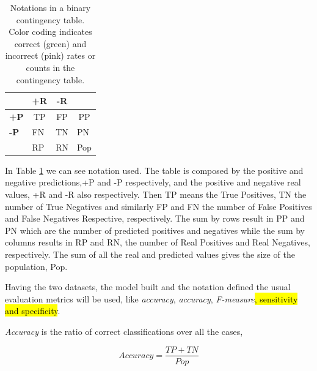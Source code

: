 \begin{table}[h]
		\begin{center}
	\begin{tabular}{l|lll}
		\multicolumn{1}{c|}{\textbf{}}   & \multicolumn{1}{c}{\textbf{+R}}                & \multicolumn{1}{c}{\textbf{-R}}                & \multicolumn{1}{c}{\textbf{}} \\ \hline
		\multicolumn{1}{c|}{\textbf{+P}} & \multicolumn{1}{c}{\cellcolor[HTML]{9AFF99}TP} & \multicolumn{1}{c}{\cellcolor[HTML]{FFCCC9}FP} & \multicolumn{1}{c}{PP}        \\
		\textbf{-P}                      & \cellcolor[HTML]{FFCCC9}FN                     & \cellcolor[HTML]{9AFF99}TN                     & PN                            \\
		& RP                                             & RN                                             & Pop                            
	\end{tabular}
		\caption{Notations in a binary contingency table. Color coding indicates correct (green) and incorrect (pink) rates or counts in the contingency table.}
		\label{tab:notation}
	\end{center}
\end{table}

In Table \ref{tab:notation} we can see notation used. The table is composed by the positive and negative predictions,+P and -P respectively, and the positive and negative real values, +R and -R also respectively. Then TP means the True Positives, TN the number of True Negatives and similarly FP and FN the number of False Positives and False Negatives Respective, respectively. The sum by rows result in PP and PN which are the number of predicted positives and negatives while the sum by columns results in RP and RN, the number of Real Positives and Real Negatives, respectively. The sum of all the real and predicted values gives the size of the population, Pop.

Having the two datasets, the model built and the notation defined the usual evaluation metrics will be used, like \emph{accuracy}, \emph{accuracy}, \emph{F-measure}\hl{, sensitivity and specificity}.

\emph{Accuracy} is the ratio of correct classifications over all the cases,

\begin{equation}
Accuracy=\frac{TP+TN}{Pop}
\label{eq:accuracy}
\end{equation} 

